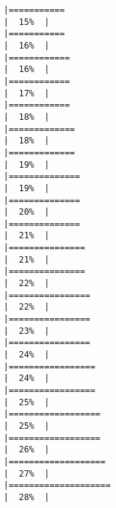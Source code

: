 \documentclass[
]{article}
\begin{document}
\begin{verbatim}
|===========                                                           |  15%  |                                                                              |===========                                                           |  16%  |                                                                              |============                                                          |  16%  |                                                                              |============                                                          |  17%  |                                                                              |============                                                          |  18%  |                                                                              |=============                                                         |  18%  |                                                                              |=============                                                         |  19%  |                                                                              |==============                                                        |  19%  |                                                                              |==============                                                        |  20%  |                                                                              |==============                                                        |  21%  |                                                                              |===============                                                       |  21%  |                                                                              |===============                                                       |  22%  |                                                                              |================                                                      |  22%  |                                                                              |================                                                      |  23%  |                                                                              |================                                                      |  24%  |                                                                              |=================                                                     |  24%  |                                                                              |=================                                                     |  25%  |                                                                              |==================                                                    |  25%  |                                                                              |==================                                                    |  26%  |                                                                              |===================                                                   |  27%  |                                                                              |====================                                                  |  28%  |                                                                              
\end{verbatim}
\end{document}
